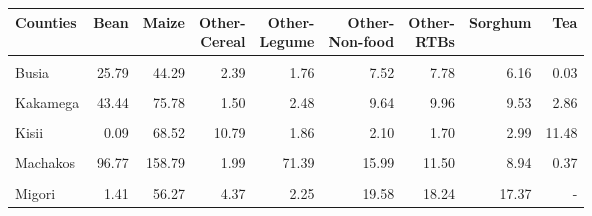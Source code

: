 \begin{table}[!h]
\centering\begingroup\fontsize{7}{9}\selectfont

\begin{tabular}{>{\raggedright\arraybackslash}p{1.8cm}rrrrrrrr}
\toprule
Counties & Bean & Maize & \makecell{Other-\\Cereal} & \makecell{Other-\\Legume} & \makecell{Other-\\Non-food} & \makecell{Other-\\RTBs} & Sorghum & Tea\\
\midrule
\cellcolor{gray!10}{Bungoma} & \cellcolor{gray!10}{57.88} & \cellcolor{gray!10}{91.63} & \cellcolor{gray!10}{2.46} & \cellcolor{gray!10}{2.17} & \cellcolor{gray!10}{16.02} & \cellcolor{gray!10}{11.69} & \cellcolor{gray!10}{11.74} & \cellcolor{gray!10}{0.11}\\
Busia & 25.79 & 44.29 & 2.39 & 1.76 & 7.52 & 7.78 & 6.16 & 0.03\\
\cellcolor{gray!10}{Homa Bay} & \cellcolor{gray!10}{0.46} & \cellcolor{gray!10}{70.27} & \cellcolor{gray!10}{3.15} & \cellcolor{gray!10}{9.63} & \cellcolor{gray!10}{8.31} & \cellcolor{gray!10}{6.11} & \cellcolor{gray!10}{25.39} & \cellcolor{gray!10}{2.11}\\
Kakamega & 43.44 & 75.78 & 1.50 & 2.48 & 9.64 & 9.96 & 9.53 & 2.86\\
\cellcolor{gray!10}{Kiambu} & \cellcolor{gray!10}{30.46} & \cellcolor{gray!10}{41.28} & \cellcolor{gray!10}{0.47} & \cellcolor{gray!10}{0.92} & \cellcolor{gray!10}{13.97} & \cellcolor{gray!10}{21.37} & \cellcolor{gray!10}{0.09} & \cellcolor{gray!10}{17.14}\\
\addlinespace
Kisii & 0.09 & 68.52 & 10.79 & 1.86 & 2.10 & 1.70 & 2.99 & 11.48\\
\cellcolor{gray!10}{Kitui} & \cellcolor{gray!10}{69.77} & \cellcolor{gray!10}{116.53} & \cellcolor{gray!10}{30.68} & \cellcolor{gray!10}{97.76} & \cellcolor{gray!10}{5.08} & \cellcolor{gray!10}{2.48} & \cellcolor{gray!10}{30.68} & \cellcolor{gray!10}{-}\\
Machakos & 96.77 & 158.79 & 1.99 & 71.39 & 15.99 & 11.50 & 8.94 & 0.37\\
\cellcolor{gray!10}{Makueni} & \cellcolor{gray!10}{56.32} & \cellcolor{gray!10}{107.91} & \cellcolor{gray!10}{2.99} & \cellcolor{gray!10}{64.68} & \cellcolor{gray!10}{11.84} & \cellcolor{gray!10}{1.63} & \cellcolor{gray!10}{8.16} & \cellcolor{gray!10}{-}\\
Migori & 1.41 & 56.27 & 4.37 & 2.25 & 19.58 & 18.24 & 17.37 & -\\
\bottomrule
\end{tabular}
\endgroup{}
\end{table}
